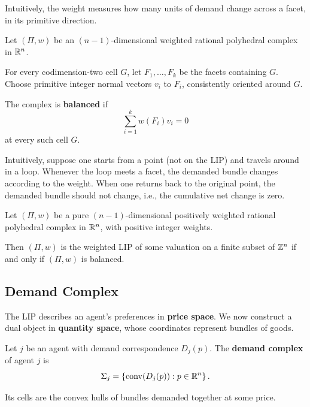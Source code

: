 \documentclass[../../main.tex]{subfiles}
\begin{document}
Intuitively, the weight measures how many units of
demand change across a facet, in its primitive direction.

\begin{defin}
    Let $(\Pi,w)$ be an $(n-1)$-dimensional weighted
    rational polyhedral complex in $\mathbb{R}^n$.

    For every codimension-two cell $G$, let
    $F_1,\dots,F_k$ be the facets containing $G$.
    Choose primitive integer normal vectors $v_i$
    to $F_i$, consistently oriented around $G$.

    The complex is \textbf{balanced} if
    \[
        \sum_{i=1}^k w(F_i)v_i=0
    \]
    at every such cell $G$.

    Intuitively, suppose one starts from a point (not on the LIP) and travels around in a loop. Whenever the loop meets a facet, the demanded bundle changes according to the weight. When one returns back to the original point, the demanded bundle should not change, i.e., the cumulative net change is zero.
\end{defin}


\begin{thm}
    Let $(\Pi,w)$ be a pure $(n-1)$-dimensional
    positively weighted rational polyhedral complex
    in $\mathbb{R}^n$, with positive integer weights.

    Then $(\Pi,w)$ is the weighted LIP of some
    valuation on a finite subset of $\mathbb{Z}^n$
    if and only if $(\Pi,w)$ is balanced.
\end{thm}

\subsection{Demand Complex}

The LIP describes an agent's preferences in \textbf{price space}.
We now construct a dual object in \textbf{quantity space}, whose
coordinates represent bundles of goods.

\begin{defin}
    Let $j$ be an agent with demand correspondence $D_j(p)$.
    The \textbf{demand complex} of agent $j$ is
    \[
        \Sigma_j=\left\{\operatorname{conv}(D_j(p)):p\in\mathbb{R}^n\right\}.
    \]
    
    Its cells are the convex hulls of bundles demanded 
    together at some price.
\end{defin}
\end{document}
